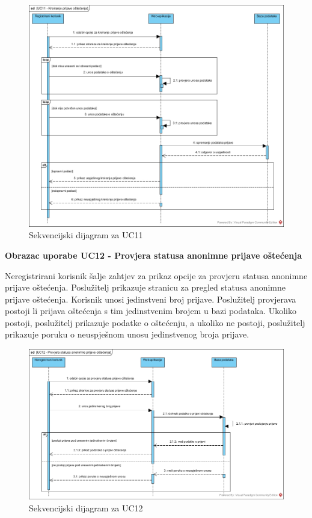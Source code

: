 \begin{figure}[H]
	\includegraphics[scale=0.5]{slike/UC11_sekvencijski.jpg} %
	\centering
	\caption{Sekvencijski dijagram za UC11}
	\label{fig:SekvencijskiDijagramKreiranjePrijaveOštećenja}
\end{figure}

\noindent \textbf{Obrazac uporabe UC12 - Provjera statusa anonimne prijave oštećenja}

Neregistrirani korisnik šalje zahtjev za prikaz opcije za provjeru statusa anonimne prijave oštećenja. Poslužitelj prikazuje stranicu
za pregled statusa anonimne prijave oštećenja. Korisnik unosi jedinstveni broj prijave. Poslužitelj provjerava postoji li prijava oštećenja
s tim jedinstvenim brojem u bazi podataka. Ukoliko postoji, poslužitelj prikazuje podatke o oštećenju, a ukoliko ne postoji, poslužitelj prikazuje
poruku o neuspješnom unosu jedinstvenog broja prijave.


\begin{figure}[H]
	\includegraphics[scale=0.5]{slike/UC12_sekvencijski.jpg} %
	\centering
	\caption{Sekvencijski dijagram za UC12}
	\label{fig:SekvencijskiDijagramProvjeraStatusaAnonimnePrijaveOštećenja}
\end{figure}

